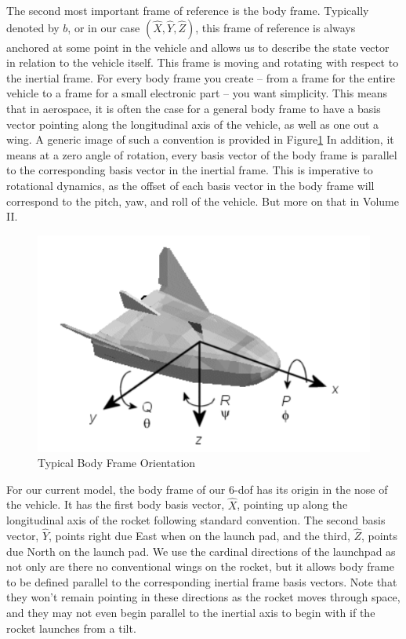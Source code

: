 \documentclass[12pt]{report}
\begin{document}
The second most important frame of reference is the \gls{body frame}. Typically denoted by $b$, or in our case $(\hat{X},\hat{Y},\hat{Z})$, this frame of reference is always anchored at some point in the vehicle and allows us to describe the \gls{state vector} in relation to the vehicle itself. This frame is moving and rotating with respect to the inertial frame. For every body frame you create – from a frame for the entire vehicle to a frame for a small electronic part – you want simplicity. This means that in aerospace, it is often the case for a general \gls{body frame} to have a basis vector pointing along the longitudinal axis of the vehicle, as well as one out a wing. A generic image of such a convention is provided in Figure\ref{fig:BodyFrameTypical} In addition, it means at a zero angle of rotation, every basis vector of the body frame is parallel to the corresponding basis vector in the inertial frame. This is imperative to rotational dynamics, as the offset of each basis vector in the \gls{body frame} will correspond to the pitch, yaw, and roll of the vehicle. But more on that in Volume II.


\begin{figure}[H]
\centering
    
\includegraphics[width=\linewidth]{BodyFrame.png}
    \caption{Typical Body Frame Orientation}
    \label{fig:BodyFrameTypical}
\end{figure}

For our current model, the body frame of our 6-\gls{dof} has its origin in the nose of the vehicle. It has the first body basis vector, $\hat{X}$, pointing up along the longitudinal axis of the rocket following standard convention. The second basis vector, $\hat{Y}$, points right due East when on the launch pad, and the third, $\hat{Z}$, points due North on the launch pad. We use the cardinal directions of the launchpad as not only are there no conventional wings on the rocket, but it allows body frame to be defined parallel to the corresponding inertial frame basis vectors. Note that they won’t remain pointing in these directions as the rocket moves through space, and they may not even begin parallel to the inertial axis to begin with if the rocket launches from a tilt.
\end{document}
